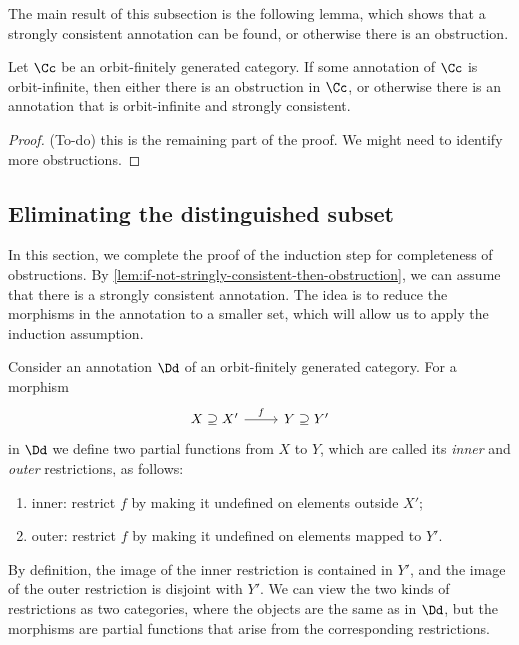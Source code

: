 The main result of this subsection is the following lemma, which shows that a strongly consistent annotation can be found, or otherwise there is an obstruction.

\begin{lemma}\label{lem:if-not-stringly-consistent-then-obstruction}
    Let $\Cc$ be an orbit-finitely generated category. If some annotation of $\Cc$ is orbit-infinite, then either there is an obstruction in $\Cc$, or otherwise there is an annotation that  is orbit-infinite and strongly consistent.  
\end{lemma}
\begin{proof}
    (To-do) this is the remaining part of the proof. We might need to identify more obstructions.
\end{proof}


\subsection{Eliminating the distinguished subset}
\label{sec:reductions}

In this section, we complete the proof of the induction step for completeness of obstructions. By \cref{lem:if-not-stringly-consistent-then-obstruction}, we can assume that there is a strongly consistent annotation. The idea is to reduce the morphisms in the annotation to a smaller set, which will allow us to apply the induction assumption.

Consider an annotation $\Dd$ of an orbit-finitely generated category. For a morphism 
\[
\begin{tikzcd}
X \supseteq X' \ar[r, "f"] & Y \supseteq Y'
\end{tikzcd}
\]
in $\Dd$ we define two partial functions from $X$ to $Y$, which are called its \emph{inner} and \emph{outer} restrictions, as follows:
\begin{enumerate}
    \item inner: restrict $f$ by making it undefined on elements outside $X'$;
    \item outer: restrict $f$ by making it undefined on elements mapped to $Y'$.
\end{enumerate}
By definition, the image of the inner restriction is contained in $Y'$, and the image of the outer restriction is disjoint with $Y'$. We can view the two kinds of restrictions as two categories, where the objects are the same as in $\Dd$, but the morphisms are partial functions that arise from the corresponding restrictions.



